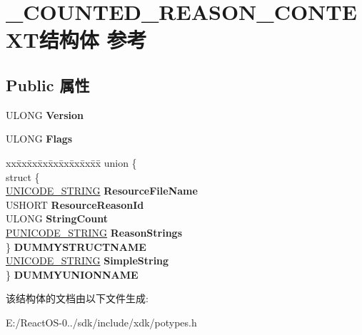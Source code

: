 \hypertarget{struct___c_o_u_n_t_e_d___r_e_a_s_o_n___c_o_n_t_e_x_t}{}\section{\+\_\+\+C\+O\+U\+N\+T\+E\+D\+\_\+\+R\+E\+A\+S\+O\+N\+\_\+\+C\+O\+N\+T\+E\+X\+T结构体 参考}
\label{struct___c_o_u_n_t_e_d___r_e_a_s_o_n___c_o_n_t_e_x_t}
\subsection*{Public 属性}
\begin{DoxyCompactItemize}
\item 
\mbox{\label{struct___c_o_u_n_t_e_d___r_e_a_s_o_n___c_o_n_t_e_x_t_a5cc40a549bb7d4e1fa1605cdf4662897}} 
U\+L\+O\+NG {\bfseries Version}
\item 
\mbox{\label{struct___c_o_u_n_t_e_d___r_e_a_s_o_n___c_o_n_t_e_x_t_afe6d92f96f7a3c648e615e70ec3bcc29}} 
U\+L\+O\+NG {\bfseries Flags}
\item 
\mbox{\label{struct___c_o_u_n_t_e_d___r_e_a_s_o_n___c_o_n_t_e_x_t_aead2d6ccedebbd774d3c83025912bff2}} 
\begin{tabbing}
xx\=xx\=xx\=xx\=xx\=xx\=xx\=xx\=xx\=\kill
union \{\\
\>struct \{\\
\>\>\hyperlink{struct___u_n_i_c_o_d_e___s_t_r_i_n_g}{UNICODE\_STRING} {\bfseries ResourceFileName}\\
\>\>USHORT {\bfseries ResourceReasonId}\\
\>\>ULONG {\bfseries StringCount}\\
\>\>\hyperlink{struct___u_n_i_c_o_d_e___s_t_r_i_n_g}{PUNICODE\_STRING} {\bfseries ReasonStrings}\\
\>\} {\bfseries DUMMYSTRUCTNAME}\\
\>\hyperlink{struct___u_n_i_c_o_d_e___s_t_r_i_n_g}{UNICODE\_STRING} {\bfseries SimpleString}\\
\} {\bfseries DUMMYUNIONNAME}\\

\end{tabbing}\end{DoxyCompactItemize}


该结构体的文档由以下文件生成\+:\begin{DoxyCompactItemize}
\item 
E\+:/\+React\+O\+S-\/0../sdk/include/xdk/potypes.\+h\end{DoxyCompactItemize}
